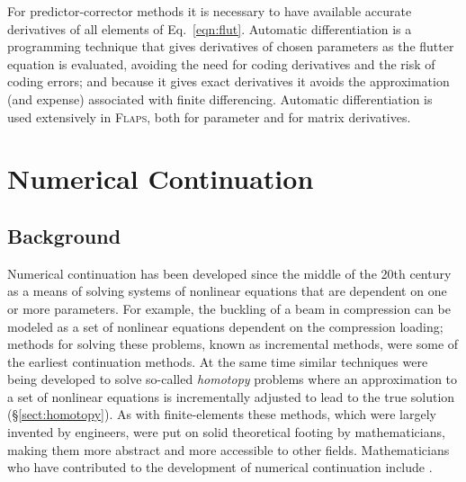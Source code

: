\documentclass[11pt,openany,twoside]{book}
\numberwithin{equation}{section}		%
\newcommand{\Newterm}[1]{{\em #1}}	%
\newcommand{\Flaps}{\textsc{Flaps\:}}
\newcommand{\Sectref}[1]{\S\ref{#1}}
\newcommand{\Eqn}[1]{Eq.\ \ref{#1}}  %
\begin{document}
For predictor-corrector methods it is necessary to have available
accurate derivatives of all elements of \Eqn{eqn:flut}. Automatic differentiation
is a programming technique that gives derivatives of chosen parameters
as the flutter equation is evaluated, avoiding the need for coding derivatives
and the risk of coding errors; and because it gives exact derivatives it
avoids the approximation (and expense) associated with finite differencing.
Automatic differentiation is used extensively in \Flaps, both for parameter
and for matrix derivatives.

\newpage
\section{Numerical Continuation}\label{sect:continuation}
\subsection{Background}
Numerical continuation has been developed since the middle of the
20th century as a means of solving systems of nonlinear equations that
are dependent on one or more parameters. For example, 
the buckling of a beam in compression can be modeled as a set of
nonlinear equations dependent on the compression loading; methods for
solving these problems, known as incremental methods,
were some of the earliest continuation methods.
At the same time similar techniques were being developed to solve
so-called \Newterm{homotopy} problems where an approximation to a set
of nonlinear equations is incrementally adjusted to lead to the true
solution (\Sectref{sect:homotopy}).
As with finite-elements these methods, which were largely
invented by engineers, were put on solid theoretical footing by
mathematicians, making them more abstract and more accessible to other
fields. Mathematicians who have contributed to the development of
numerical continuation include
\cite{allgower1990numerical,
keller1987lectures,
rheinboldt1981numerical,
rheinboldt1983locally,
rheinboldt1983algorithm,rheinboldt1986numerical}.
\end{document}
